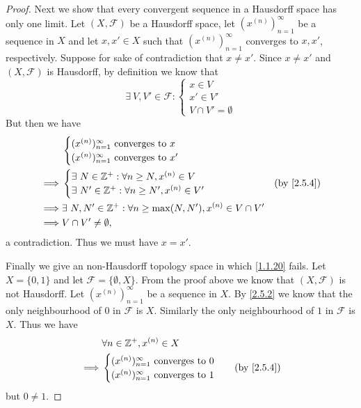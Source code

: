 \begin{proof}
  Next we show that every convergent sequence in a Hausdorff space has only one limit.
  Let \((X, \mathcal{F})\) be a Hausdorff space, let \((x^{(n)})_{n = 1}^\infty\) be a sequence in \(X\) and let \(x, x' \in X\) such that \((x^{(n)})_{n = 1}^\infty\) converges to \(x, x'\), respectively.
  Suppose for sake of contradiction that \(x \neq x'\).
  Since \(x \neq x'\) and \((X, \mathcal{F})\) is Hausdorff, by definition we know that
  \[
    \exists\ V, V' \in \mathcal{F} : \begin{cases}
      x \in V   \\
      x' \in V' \\
      V \cap V' = \emptyset
    \end{cases}
  \]
  But then we have
  \begin{align*}
             & \begin{cases}
                 (x^{(n)})_{n = 1}^\infty \text{ converges to } x \\
                 (x^{(n)})_{n = 1}^\infty \text{ converges to } x'
               \end{cases}                            \\
    \implies & \begin{cases}
                 \exists\ N \in \Z^+ : \forall n \geq N, x^{(n)} \in V \\
                 \exists\ N' \in \Z^+ : \forall n \geq N', x^{(n)} \in V'
               \end{cases}                    & \text{(by \cref{2.5.4})}                   \\
    \implies & \exists\ N, N' \in \Z^+ : \forall n \geq \max(N, N'), x^{(n)} \in V \cap V' \\
    \implies & V \cap V' \neq \emptyset,
  \end{align*}
  a contradiction.
  Thus we must have \(x = x'\).

  Finally we give an non-Hausdorff topology space in which \cref{1.1.20} fails.
  Let \(X = \{0, 1\}\) and let \(\mathcal{F} = \{\emptyset, X\}\).
  From the proof above we know that \((X, \mathcal{F})\) is not Hausdorff.
  Let \((x^{(n)})_{n = 1}^\infty\) be a sequence in \(X\).
  By \cref{2.5.2} we know that the only neighbourhood of \(0\) in \(\mathcal{F}\) is \(X\).
  Similarly the only neighbourhood of \(1\) in \(\mathcal{F}\) is \(X\).
  Thus we have
  \begin{align*}
             & \forall n \in \Z^+, x^{(n)} \in X                \\
    \implies & \begin{cases}
                 (x^{(n)})_{n = 1}^\infty \text{ converges to } 0 \\
                 (x^{(n)})_{n = 1}^\infty \text{ converges to } 1
               \end{cases} & \text{(by \cref{2.5.4})}
  \end{align*}
  but \(0 \neq 1\).
\end{proof}

